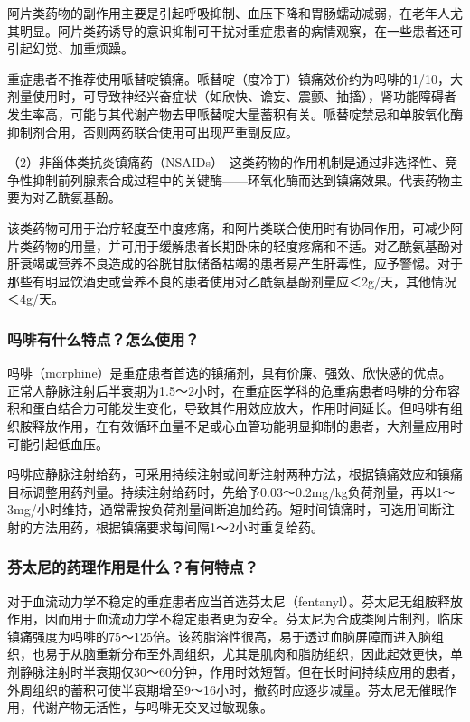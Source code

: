 阿片类药物的副作用主要是引起呼吸抑制、血压下降和胃肠蠕动减弱，在老年人尤其明显。阿片类药诱导的意识抑制可干扰对重症患者的病情观察，在一些患者还可引起幻觉、加重烦躁。

重症患者不推荐使用哌替啶镇痛。哌替啶（度冷丁）镇痛效价约为吗啡的1/10，大剂量使用时，可导致神经兴奋症状（如欣快、谵妄、震颤、抽搐），肾功能障碍者发生率高，可能与其代谢产物去甲哌替啶大量蓄积有关。哌替啶禁忌和单胺氧化酶抑制剂合用，否则两药联合使用可出现严重副反应。

（2）非甾体类抗炎镇痛药（NSAIDs）　这类药物的作用机制是通过非选择性、竞争性抑制前列腺素合成过程中的关键酶------环氧化酶而达到镇痛效果。代表药物主要为对乙酰氨基酚。

该类药物可用于治疗轻度至中度疼痛，和阿片类联合使用时有协同作用，可减少阿片类药物的用量，并可用于缓解患者长期卧床的轻度疼痛和不适。对乙酰氨基酚对肝衰竭或营养不良造成的谷胱甘肽储备枯竭的患者易产生肝毒性，应予警惕。对于那些有明显饮酒史或营养不良的患者使用对乙酰氨基酚剂量应＜2g/天，其他情况＜4g/天。

\subsubsection{吗啡有什么特点？怎么使用？}

吗啡（morphine）是重症患者首选的镇痛剂，具有价廉、强效、欣快感的优点。正常人静脉注射后半衰期为1.5～2小时，在重症医学科的危重病患者吗啡的分布容积和蛋白结合力可能发生变化，导致其作用效应放大，作用时间延长。但吗啡有组织胺释放作用，在有效循环血量不足或心血管功能明显抑制的患者，大剂量应用时可能引起低血压。

吗啡应静脉注射给药，可采用持续注射或间断注射两种方法，根据镇痛效应和镇痛目标调整用药剂量。持续注射给药时，先给予0.03～0.2mg/kg负荷剂量，再以1～3mg/小时维持，通常需按负荷剂量间断追加给药。短时间镇痛时，可选用间断注射的方法用药，根据镇痛要求每间隔1～2小时重复给药。

\subsubsection{芬太尼的药理作用是什么？有何特点？}

对于血流动力学不稳定的重症患者应当首选芬太尼（fentanyl）。芬太尼无组胺释放作用，因而用于血流动力学不稳定患者更为安全。芬太尼为合成类阿片制剂，临床镇痛强度为吗啡的75～125倍。该药脂溶性很高，易于透过血脑屏障而进入脑组织，也易于从脑重新分布至外周组织，尤其是肌肉和脂肪组织，因此起效更快，单剂静脉注射时半衰期仅30～60分钟，作用时效短暂。但在长时间持续应用的患者，外周组织的蓄积可使半衰期增至9～16小时，撤药时应逐步减量。芬太尼无催眠作用，代谢产物无活性，与吗啡无交叉过敏现象。

